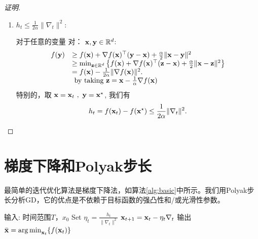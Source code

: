 \begin{proof}[证明]
\begin{enumerate}
\item   $h_t \leq \frac{1}{2\alpha} \|\nabla_t\|^2 $:  %
    
对于任意的变量 对：
$\mathbf x,\mathbf y \in {\mathbb R}^d$:
\begin{equation*}
\begin{array}{cl}
f(\mathbf y)  & \ge  f(\mathbf x) +   \nabla f(\mathbf x)^\top  (\mathbf y - \mathbf x ) + \frac{\alpha}{2}  \|\mathbf x - \mathbf y\|^2  \\
&\ge  \min_{\mathbf z \in {\mathbb R}^d } \left\{ f(\mathbf x) +   \nabla f(\mathbf x)^\top  (\mathbf z - \mathbf x ) + \frac{\alpha}{2}  \|\mathbf x - \mathbf z\|^2 \right\} \\
& =  f(\mathbf x) - \frac{1}{2  \alpha} \| \nabla f(\mathbf x)\|^2. \\
& \text{ by taking $\mathbf z = \mathbf x - \frac{1}{ \alpha} \nabla f(\mathbf x) $ }
\end{array}
\end{equation*}
特别的，取
$\mathbf x = \mathbf x_t \ , \ \mathbf y = \mathbf x^\star$, 
我们有
\begin{equation} \label{eqn:gradlowerbound}
 h_t =  f(\mathbf x_t) - f(\mathbf x^\star)  \leq \frac{1}{2 \alpha} \|\nabla_t\|^2  .
\end{equation}

\end{enumerate}
\end{proof}





\section{
    梯度下降和Polyak步长
    } 

最简单的迭代优化算法是梯度下降法，如算法\ref{alg:basic}中所示。我们用Polyak步长分析GD，它的优点是不依赖于目标函数的强凸性和/或光滑性参数。
\begin{algorithm}[h!]
\caption{
    使用Polyak步长的GD
    }
\label{alg:basic}
\begin{algorithmic}[1]
\STATE 输入: 时间范围$T$，$x_0$ %
\STATE Set $\eta_t =  \frac{h_t}{\|\nabla_t\|^2} $
\STATE  $ \mathbf x_{t+1}  =   \mathbf x_t - \eta_t \nabla_t $
\ENDFOR
\STATE %
输出
$\bar{\mathbf{x}} = \operatorname*{\arg\min}_{\mathbf x_t} \{ f(\mathbf x_t) \}$
\end{algorithmic}
\end{algorithm}


